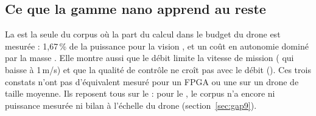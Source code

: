 \subsection{Ce que la gamme nano apprend au reste}

La  est la seule du corpus où la part du calcul dans le budget du drone est
mesurée : 1,67\,\% de la puissance pour la vision
\citep[Table~IV]{arxiv-2301.12175-bio-inspired-autonomous-exploration-policies}, et un
coût en autonomie dominé par la masse
\citep[Table~IV]{arxiv-1805.01831-64mw-dnn-visual-navigation-engine}. Elle montre aussi que
le débit limite la vitesse de mission ( qui baisse à 1\,m/s) et que la
qualité de contrôle ne croît pas avec le débit (). Ces trois constats n'ont
pas d'équivalent mesuré pour un FPGA ou une  sur un drone de taille moyenne. Ils
reposent tous sur le  : pour le , le corpus n'a encore ni puissance mesurée ni
bilan à l'échelle du drone (section~\ref{sec:gap9}).
